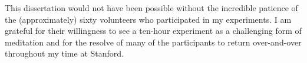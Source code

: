 This dissertation would not have been possible without the incredible patience of the (approximately) sixty volunteers who participated in my experiments. I am grateful for their willingness to see a ten-hour experiment as a challenging form of meditation and for the resolve of many of the participants to return over-and-over throughout my time at Stanford.

